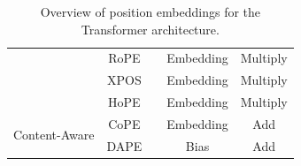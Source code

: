 \documentclass[11pt, a4paper, logo, copyright, nonumbering]{map}
\newcommand{\Checkmark}{\ding{51}} %
\newcommand{\XSolidBrush}{\ding{55}} %
\begin{document}
\begin{table}[t!]
\begin{tabular}{lcccc}
                               & RoPE \cite{su2024roformer}                     & \XSolidBrush      & Embedding         & Multiply            \\
                               & XPOS \cite{sun2022length}                      & \XSolidBrush      & Embedding         & Multiply            \\
                               & HoPE \cite{chen2024hope}                       & \XSolidBrush      & Embedding         & Multiply            \\ \midrule
\multirow{2}{*}{Content-Aware} & CoPE \cite{golovneva2024contextual}            & \Checkmark      & Embedding         & Add                 \\
                               & DAPE \cite{zheng2025dape,zheng2024dape}                      & \Checkmark      & Bias              & Add                 \\ \bottomrule
\end{tabular}
\caption{Overview of position embeddings for the Transformer architecture.}
\label{tab:pe}
\end{table}
\end{document}
